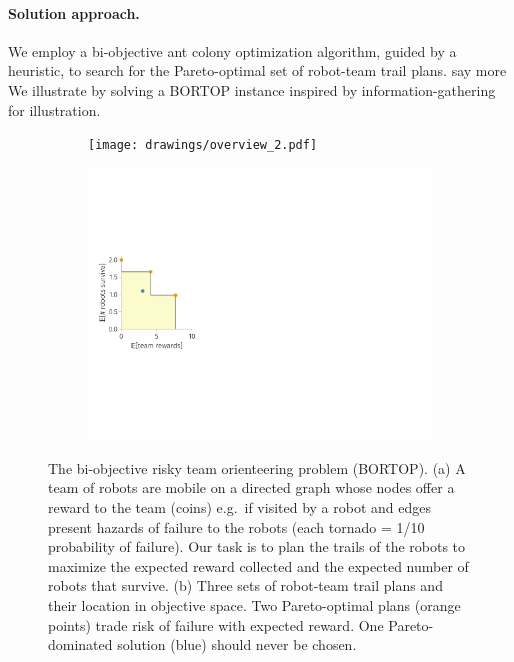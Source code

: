 \documentclass[11pt, oneside]{article}
\begin{document}
\paragraph{Solution approach.} We employ a bi-objective ant colony optimization algorithm, guided by a heuristic, to search for the Pareto-optimal set of robot-team trail plans.
{\color{red} say more}
We illustrate by solving a BORTOP instance inspired by information-gathering for illustration.

\begin{figure}[h!]
    \centering
     \begin{subfigure}[b]{0.6\textwidth}
    	\texttt{[image: drawings/overview\_2.pdf]}
	\caption{} \label{fig:overview}
    \end{subfigure}
    \begin{subfigure}[b]{0.6\textwidth}
    	\includegraphics[width=\textwidth]{drawings/toy_pareto_front.pdf}
	\caption{} \label{fig:pareto_optimal}
    \end{subfigure}
    \caption{
      The bi-objective risky team orienteering problem (BORTOP). 
      (a) A team of robots are mobile on a directed graph whose 
      nodes offer a reward to the team (coins) e.g.\ if visited by a robot and 
      edges present hazards of failure to the robots (each tornado = 1/10 probability of failure). Our task is to plan the trails of the robots to maximize the expected reward collected and the expected number of robots that survive.
      (b) Three sets of robot-team trail plans and their location in objective space. Two Pareto-optimal plans (orange points) trade risk of failure with expected reward. One Pareto-dominated solution (blue) should never be chosen.
    }
\end{figure}
\end{document}
